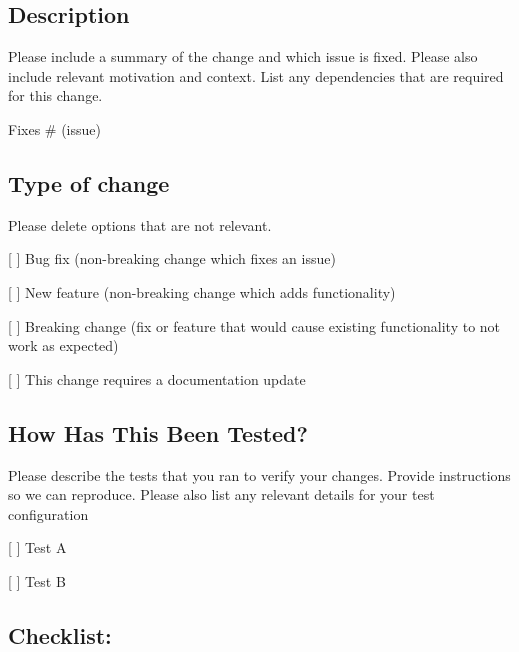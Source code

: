 \subsection*{Description}

Please include a summary of the change and which issue is fixed. Please also include relevant motivation and context. List any dependencies that are required for this change.

Fixes \# (issue)

\subsection*{Type of change}

Please delete options that are not relevant.


\begin{DoxyItemize}
\item \mbox{[} \mbox{]} Bug fix (non-\/breaking change which fixes an issue)
\item \mbox{[} \mbox{]} New feature (non-\/breaking change which adds functionality)
\item \mbox{[} \mbox{]} Breaking change (fix or feature that would cause existing functionality to not work as expected)
\item \mbox{[} \mbox{]} This change requires a documentation update
\end{DoxyItemize}

\subsection*{How Has This Been Tested?}

Please describe the tests that you ran to verify your changes. Provide instructions so we can reproduce. Please also list any relevant details for your test configuration


\begin{DoxyItemize}
\item \mbox{[} \mbox{]} Test A
\item \mbox{[} \mbox{]} Test B
\end{DoxyItemize}

\subsection*{Checklist\+:}


